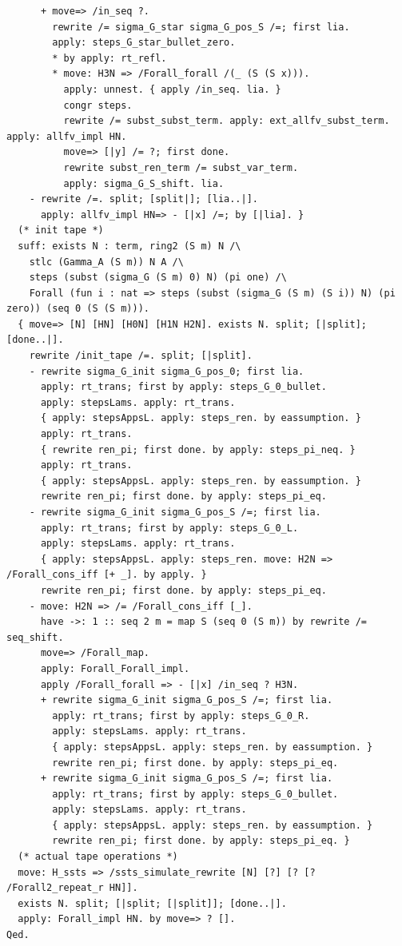\documentclass[10pt,a4paper]{amsart}
\begin{document}
\begin{lstlisting}
      + move=> /in_seq ?.
        rewrite /= sigma_G_star sigma_G_pos_S /=; first lia.
        apply: steps_G_star_bullet_zero.
        * by apply: rt_refl.
        * move: H3N => /Forall_forall /(_ (S (S x))).
          apply: unnest. { apply /in_seq. lia. }
          congr steps.
          rewrite /= subst_subst_term. apply: ext_allfv_subst_term. apply: allfv_impl HN.
          move=> [|y] /= ?; first done.
          rewrite subst_ren_term /= subst_var_term.
          apply: sigma_G_S_shift. lia.
    - rewrite /=. split; [split|]; [lia..|].
      apply: allfv_impl HN=> - [|x] /=; by [|lia]. }
  (* init tape *)
  suff: exists N : term, ring2 (S m) N /\
    stlc (Gamma_A (S m)) N A /\
    steps (subst (sigma_G (S m) 0) N) (pi one) /\
    Forall (fun i : nat => steps (subst (sigma_G (S m) (S i)) N) (pi zero)) (seq 0 (S (S m))).
  { move=> [N] [HN] [H0N] [H1N H2N]. exists N. split; [|split]; [done..|].
    rewrite /init_tape /=. split; [|split].
    - rewrite sigma_G_init sigma_G_pos_0; first lia.
      apply: rt_trans; first by apply: steps_G_0_bullet.
      apply: stepsLams. apply: rt_trans.
      { apply: stepsAppsL. apply: steps_ren. by eassumption. }
      apply: rt_trans.
      { rewrite ren_pi; first done. by apply: steps_pi_neq. }
      apply: rt_trans.
      { apply: stepsAppsL. apply: steps_ren. by eassumption. }
      rewrite ren_pi; first done. by apply: steps_pi_eq.
    - rewrite sigma_G_init sigma_G_pos_S /=; first lia.
      apply: rt_trans; first by apply: steps_G_0_L.
      apply: stepsLams. apply: rt_trans.
      { apply: stepsAppsL. apply: steps_ren. move: H2N => /Forall_cons_iff [+ _]. by apply. }
      rewrite ren_pi; first done. by apply: steps_pi_eq.
    - move: H2N => /= /Forall_cons_iff [_].
      have ->: 1 :: seq 2 m = map S (seq 0 (S m)) by rewrite /= seq_shift.
      move=> /Forall_map.
      apply: Forall_Forall_impl.
      apply /Forall_forall => - [|x] /in_seq ? H3N.
      + rewrite sigma_G_init sigma_G_pos_S /=; first lia.
        apply: rt_trans; first by apply: steps_G_0_R.
        apply: stepsLams. apply: rt_trans.
        { apply: stepsAppsL. apply: steps_ren. by eassumption. }
        rewrite ren_pi; first done. by apply: steps_pi_eq.
      + rewrite sigma_G_init sigma_G_pos_S /=; first lia.
        apply: rt_trans; first by apply: steps_G_0_bullet.
        apply: stepsLams. apply: rt_trans.
        { apply: stepsAppsL. apply: steps_ren. by eassumption. }
        rewrite ren_pi; first done. by apply: steps_pi_eq. }
  (* actual tape operations *)
  move: H_ssts => /ssts_simulate_rewrite [N] [?] [? [? /Forall2_repeat_r HN]].
  exists N. split; [|split; [|split]]; [done..|].
  apply: Forall_impl HN. by move=> ? [].
Qed.


\end{lstlisting}
\end{document}
